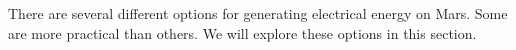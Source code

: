

There are several different options for generating electrical energy on Mars. Some are more practical than others. We will explore these options in this section.



